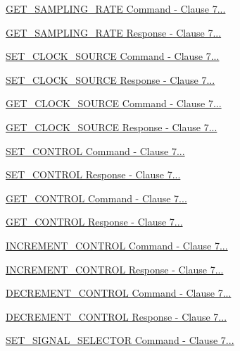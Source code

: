 \begin{DoxyCompactItemize}
\item 
\hyperlink{group__command__get__sampling__rate}{G\+E\+T\+\_\+\+S\+A\+M\+P\+L\+I\+N\+G\+\_\+\+R\+A\+T\+E Command -\/ Clause 7...}
\item 
\hyperlink{group__command__get__sampling__rate__response}{G\+E\+T\+\_\+\+S\+A\+M\+P\+L\+I\+N\+G\+\_\+\+R\+A\+T\+E Response -\/ Clause 7...}
\item 
\hyperlink{group__command__set__clock__source}{S\+E\+T\+\_\+\+C\+L\+O\+C\+K\+\_\+\+S\+O\+U\+R\+C\+E Command -\/ Clause 7...}
\item 
\hyperlink{group__command__set__clock__source__response}{S\+E\+T\+\_\+\+C\+L\+O\+C\+K\+\_\+\+S\+O\+U\+R\+C\+E Response -\/ Clause 7...}
\item 
\hyperlink{group__command__get__clock__source}{G\+E\+T\+\_\+\+C\+L\+O\+C\+K\+\_\+\+S\+O\+U\+R\+C\+E Command -\/ Clause 7...}
\item 
\hyperlink{group__command__get__clock__source__response}{G\+E\+T\+\_\+\+C\+L\+O\+C\+K\+\_\+\+S\+O\+U\+R\+C\+E Response -\/ Clause 7...}
\item 
\hyperlink{group__command__set__control}{S\+E\+T\+\_\+\+C\+O\+N\+T\+R\+O\+L Command -\/ Clause 7...}
\item 
\hyperlink{group__command__set__control__response}{S\+E\+T\+\_\+\+C\+O\+N\+T\+R\+O\+L Response -\/ Clause 7...}
\item 
\hyperlink{group__command__get__control}{G\+E\+T\+\_\+\+C\+O\+N\+T\+R\+O\+L Command -\/ Clause 7...}
\item 
\hyperlink{group__command__get__control__response}{G\+E\+T\+\_\+\+C\+O\+N\+T\+R\+O\+L Response -\/ Clause 7...}
\item 
\hyperlink{group__command__increment__control}{I\+N\+C\+R\+E\+M\+E\+N\+T\+\_\+\+C\+O\+N\+T\+R\+O\+L Command -\/ Clause 7...}
\item 
\hyperlink{group__command__increment__control__response}{I\+N\+C\+R\+E\+M\+E\+N\+T\+\_\+\+C\+O\+N\+T\+R\+O\+L Response -\/ Clause 7...}
\item 
\hyperlink{group__command__decrement__control}{D\+E\+C\+R\+E\+M\+E\+N\+T\+\_\+\+C\+O\+N\+T\+R\+O\+L Command -\/ Clause 7...}
\item 
\hyperlink{group__command__decrement__control__response}{D\+E\+C\+R\+E\+M\+E\+N\+T\+\_\+\+C\+O\+N\+T\+R\+O\+L Response -\/ Clause 7...}
\item 
\hyperlink{group__command__set__signal__selector}{S\+E\+T\+\_\+\+S\+I\+G\+N\+A\+L\+\_\+\+S\+E\+L\+E\+C\+T\+O\+R Command -\/ Clause 7...}

\end{DoxyCompactItemize}
